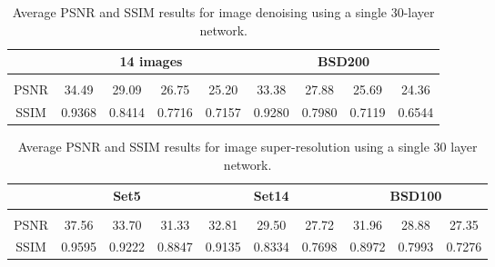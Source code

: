 \begin{table*}
\small
\centering
\caption{Average PSNR and SSIM results for image denoising using a single 30-layer network.}
\begin{tabular}{c|c c c c|c c c c} \hline
       &\multicolumn{4}{c|}{14 images}                      &\multicolumn{4}{c}{BSD200}                        \\ \hline
       & & & & & & & & \\ \hline
  PSNR &34.49       &29.09       &26.75       &25.20       &33.38       &27.88       &25.69       &24.36       \\ \hline
  SSIM &0.9368      &0.8414      &0.7716      &0.7157      &0.9280      &0.7980      &0.7119      &0.6544      \\ \hline
\end{tabular}
\label{table7}
\end{table*}

\begin{table*}
\small
\centering
\caption{Average PSNR and SSIM results for image super-resolution using a single 30 layer network.}
\begin{tabular}{c|c c c|c c c|c c c} \hline
       &\multicolumn{3}{c|}{Set5}    &\multicolumn{3}{c|}{Set14}   &\multicolumn{3}{c}{BSD100}   \\ \hline
       &  &  &  &  &  &  &  &  &  \\ \hline
  PSNR &37.56    &33.70    &31.33    &32.81    &29.50    &27.72    &31.96    &28.88    &27.35    \\ \hline
  SSIM &0.9595   &0.9222   &0.8847   &0.9135   &0.8334   &0.7698   &0.8972   &0.7993   &0.7276   \\ \hline
\end{tabular}
\label{table8}
\end{table*}






